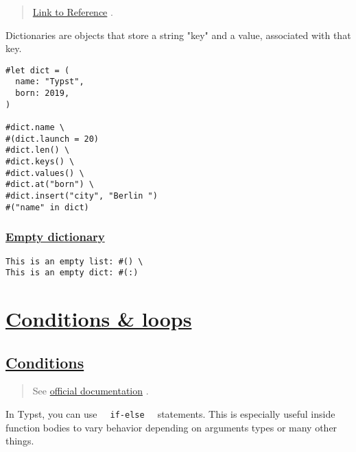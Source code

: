 \begin{quote}
\href{https://typst.app/docs/reference/foundations/dictionary/}{Link to
Reference} .
\end{quote}

Dictionaries are objects that store a string "key" and a value,
associated with that key.

\begin{verbatim}
#let dict = (
  name: "Typst",
  born: 2019,
)

#dict.name \
#(dict.launch = 20)
#dict.len() \
#dict.keys() \
#dict.values() \
#dict.at("born") \
#dict.insert("city", "Berlin ")
#("name" in dict)
\end{verbatim}

\pandocbounded{}

\subsubsection{\texorpdfstring{\hyperref[empty-dictionary]{Empty
dictionary}}{Empty dictionary}}\label{empty-dictionary}

\begin{verbatim}
This is an empty list: #() \
This is an empty dict: #(:)
\end{verbatim}

\pandocbounded{}

\section{\texorpdfstring{\hyperref[conditions--loops]{Conditions \&
loops}}{Conditions \& loops}}\label{conditions--loops}

\subsection{\texorpdfstring{\hyperref[conditions]{Conditions}}{Conditions}}\label{conditions}

\begin{quote}
See
\href{https://typst.app/docs/reference/scripting/\#conditionals}{official
documentation} .
\end{quote}

In Typst, you can use \texttt{\ }{\texttt{\ if-else\ }}\texttt{\ }
statements. This is especially useful inside function bodies to vary
behavior depending on arguments types or many other things.

